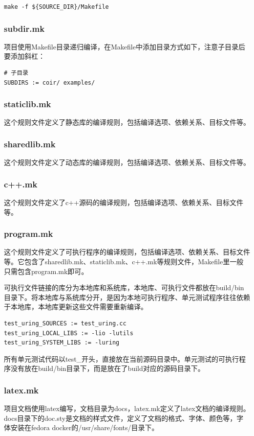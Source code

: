 \documentclass{article}
\begin{document}
\begin{lstlisting}[style=bash]
make -f ${SOURCE_DIR}/Makefile
\end{lstlisting}

\subsubsection*{subdir.mk}

项目使用Makefile目录递归编译，在Makefile中添加目录方式如下，注意子目录后要添加斜杠：
\begin{lstlisting}[style=make]
# 子目录
SUBDIRS := coir/ examples/
\end{lstlisting}

\subsubsection*{staticlib.mk}

这个规则文件定义了静态库的编译规则，包括编译选项、依赖关系、目标文件等。

\subsubsection*{sharedlib.mk}

这个规则文件定义了动态库的编译规则，包括编译选项、依赖关系、目标文件等。

\subsubsection*{c++.mk}

这个规则文件定义了c++源码的编译规则，包括编译选项、依赖关系、目标文件等。

\subsubsection*{program.mk}

这个规则文件定义了可执行程序的编译规则，包括编译选项、依赖关系、目标文件等。它包含了sharedlib.mk、staticlib.mk、c++.mk等规则文件，Makefile里一般只需包含program.mk即可。

可执行文件链接的库分为本地库和系统库，本地库、可执行文件都放在build/bin目录下。将本地库与系统库分开，是因为本地可执行程序、单元测试程序往往依赖于本地库，本地库更新这些文件需要重新编译。
\begin{lstlisting}[style=make]
test_uring_SOURCES := test_uring.cc
test_uring_LOCAL_LIBS := -lio -lutils
test_uring_SYSTEM_LIBS := -luring
\end{lstlisting}

所有单元测试代码以test\_开头，直接放在当前源码目录中。单元测试的可执行程序没有放在build/bin目录下，而是放在了build对应的源码目录下。

\subsubsection*{latex.mk}

项目文档使用latex编写，文档目录为docs，latex.mk定义了latex文档的编译规则。docs目录下的doc.sty是文档的样式文件，定义了文档的格式、字体、颜色等，字体安装在fedora docker的/usr/share/fonts/目录下。


\printbibliography

\appendix
\end{document}
